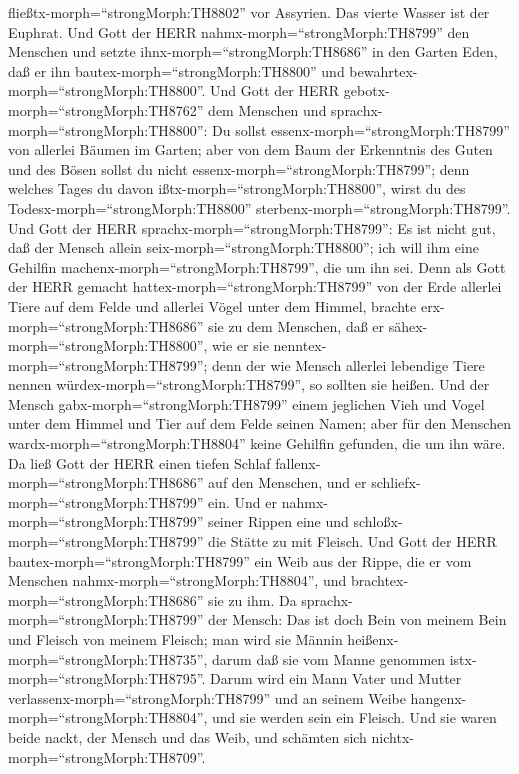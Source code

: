 fließtx-morph=``strongMorph:TH8802'' vor Assyrien. Das vierte Wasser ist
der Euphrat.  Und Gott der HERR
nahmx-morph=``strongMorph:TH8799'' den Menschen und setzte
ihnx-morph=``strongMorph:TH8686'' in den Garten Eden, daß er ihn
bautex-morph=``strongMorph:TH8800'' und
bewahrtex-morph=``strongMorph:TH8800''.  Und Gott der HERR
gebotx-morph=``strongMorph:TH8762'' dem Menschen und
sprachx-morph=``strongMorph:TH8800'': Du sollst
essenx-morph=``strongMorph:TH8799'' von allerlei Bäumen im Garten;
 aber von dem Baum der Erkenntnis des Guten und des Bösen
sollst du nicht essenx-morph=``strongMorph:TH8799''; denn welches Tages
du davon ißtx-morph=``strongMorph:TH8800'', wirst du des
Todesx-morph=``strongMorph:TH8800''
sterbenx-morph=``strongMorph:TH8799''.  Und Gott der HERR
sprachx-morph=``strongMorph:TH8799'': Es ist nicht gut, daß der Mensch
allein seix-morph=``strongMorph:TH8800''; ich will ihm eine Gehilfin
machenx-morph=``strongMorph:TH8799'', die um ihn sei.  Denn
als Gott der HERR gemacht hattex-morph=``strongMorph:TH8799'' von der
Erde allerlei Tiere auf dem Felde und allerlei Vögel unter dem Himmel,
brachte erx-morph=``strongMorph:TH8686'' sie zu dem Menschen, daß er
sähex-morph=``strongMorph:TH8800'', wie er sie
nenntex-morph=``strongMorph:TH8799''; denn der wie Mensch allerlei
lebendige Tiere nennen würdex-morph=``strongMorph:TH8799'', so sollten
sie heißen.  Und der Mensch
gabx-morph=``strongMorph:TH8799'' einem jeglichen Vieh und Vogel unter
dem Himmel und Tier auf dem Felde seinen Namen; aber für den Menschen
wardx-morph=``strongMorph:TH8804'' keine Gehilfin gefunden, die um ihn
wäre.  Da ließ Gott der HERR einen tiefen Schlaf
fallenx-morph=``strongMorph:TH8686'' auf den Menschen, und er
schliefx-morph=``strongMorph:TH8799'' ein. Und er
nahmx-morph=``strongMorph:TH8799'' seiner Rippen eine und
schloßx-morph=``strongMorph:TH8799'' die Stätte zu mit Fleisch.
 Und Gott der HERR bautex-morph=``strongMorph:TH8799'' ein
Weib aus der Rippe, die er vom Menschen
nahmx-morph=``strongMorph:TH8804'', und
brachtex-morph=``strongMorph:TH8686'' sie zu ihm.  Da
sprachx-morph=``strongMorph:TH8799'' der Mensch: Das ist doch Bein von
meinem Bein und Fleisch von meinem Fleisch; man wird sie Männin
heißenx-morph=``strongMorph:TH8735'', darum daß sie vom Manne genommen
istx-morph=``strongMorph:TH8795''.  Darum wird ein Mann
Vater und Mutter verlassenx-morph=``strongMorph:TH8799'' und an seinem
Weibe hangenx-morph=``strongMorph:TH8804'', und sie werden sein ein
Fleisch.  Und sie waren beide nackt, der Mensch und das
Weib, und schämten sich nichtx-morph=``strongMorph:TH8709''.

